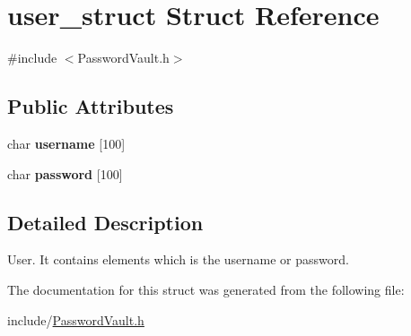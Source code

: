 \hypertarget{structuser__struct}{}\section{user\+\_\+struct Struct Reference}
\label{structuser__struct}


{\ttfamily \#include $<$Password\+Vault.\+h$>$}

\subsection*{Public Attributes}
\begin{DoxyCompactItemize}
\item 
\mbox{\label{structuser__struct_aa74330bd94dc3926e50fe022f1c147b7}} 
char {\bfseries username} \mbox{[}100\mbox{]}
\item 
\mbox{\label{structuser__struct_abbe8ba686390f2b2cb5be3263f5e1eb5}} 
char {\bfseries password} \mbox{[}100\mbox{]}
\end{DoxyCompactItemize}


\subsection{Detailed Description}
User. It contains elements which is the username or password. 

The documentation for this struct was generated from the following file\+:\begin{DoxyCompactItemize}
\item 
include/\hyperlink{PasswordVault_8h}{Password\+Vault.\+h}\end{DoxyCompactItemize}
